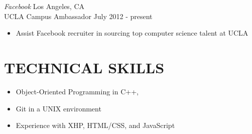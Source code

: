 \documentclass{res}
\begin{document}
\begin{resume}
  {\sl Facebook} \hfill Los Angeles, CA \\
  UCLA Campus Ambassador \hfill July 2012 - present
  \begin{itemize} \itemsep -2pt
    \item Assist Facebook recruiter in sourcing top computer science talent at UCLA
  \end{itemize} \vspace{-6pt}

\section{TECHNICAL SKILLS}
\vspace{0.2in}
  \begin{itemize}  \itemsep -2pt
    \item Object-Oriented Programming in C++,
    \item  Git in a UNIX environment
    \item Experience with XHP, HTML/CSS, and JavaScript
  \end{itemize}
\end{resume}
\end{document}
